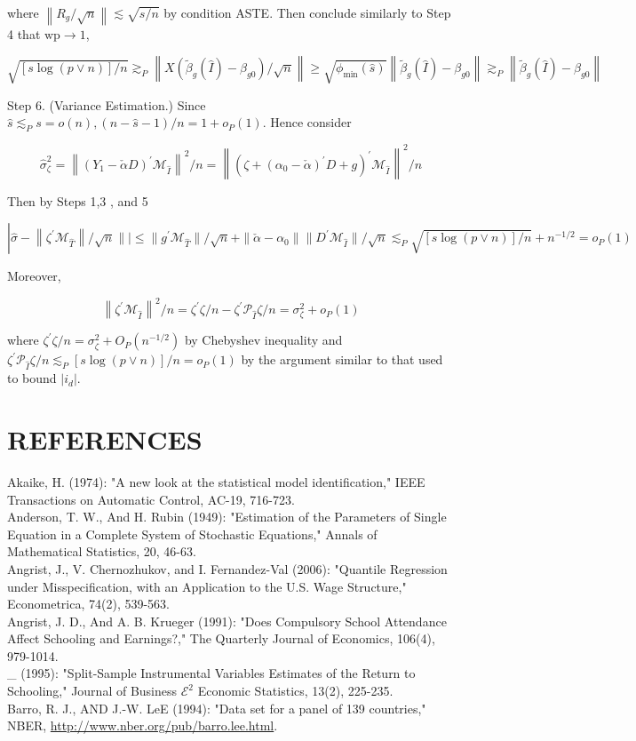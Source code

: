 \documentclass[10pt]{article}
\begin{document}
where \(\left\|R_{g} / \sqrt{n}\right\| \lesssim \sqrt{s / n}\) by condition ASTE. Then conclude similarly to Step 4 that \(\mathrm{wp} \rightarrow 1\),

\[
\sqrt{[s \log (p \vee n)] / n} \gtrsim_{P}\left\|X\left(\tilde{\beta}_{g}(\widehat{I})-\beta_{g 0}\right) / \sqrt{n}\right\| \geqslant \sqrt{\phi_{\min }(\widehat{s})}\left\|\tilde{\beta}_{g}(\widehat{I})-\beta_{g 0}\right\| \gtrsim_{P}\left\|\tilde{\beta}_{g}(\widehat{I})-\beta_{g 0}\right\|
\]

Step 6. (Variance Estimation.) Since \(\widehat{s} \lesssim_{P} s=o(n),(n-\widehat{s}-1) / n=1+o_{P}(1)\). Hence consider

\[
\widehat{\sigma}_{\zeta}^{2}=\left\|\left(Y_{1}-\check{\alpha} D\right)^{\prime} \mathcal{M}_{\widehat{I}}\right\|^{2} / n=\left\|\left(\zeta+\left(\alpha_{0}-\check{\alpha}\right)^{\prime} D+g\right)^{\prime} \mathcal{M}_{\widehat{I}}\right\|^{2} / n
\]

Then by Steps 1,3 , and 5

\[
\left|\hat{\sigma}-\left\|\zeta^{\prime} \mathcal{M}_{\hat{T}}\right\| / \sqrt{n}\|\mid \leqslant\| g^{\prime} \mathcal{M}_{\widehat{T}}\|/ \sqrt{n}+\| \check{\alpha}-\alpha_{0}\|\| D^{\prime} \mathcal{M}_{\hat{I}} \| / \sqrt{n} \lesssim_{P} \sqrt{[s \log (p \vee n)] / n}+n^{-1 / 2}=o_{P}(1)\right.
\]

Moreover,

\[
\left\|\zeta^{\prime} \mathcal{M}_{\widehat{I}}\right\|^{2} / n=\zeta^{\prime} \zeta / n-\zeta^{\prime} \mathcal{P}_{\widehat{I}} \zeta / n=\sigma_{\zeta}^{2}+o_{P}(1)
\]

where \(\zeta^{\prime} \zeta / n=\sigma_{\zeta}^{2}+O_{P}\left(n^{-1 / 2}\right)\) by Chebyshev inequality and \(\zeta^{\prime} \mathcal{P}_{\hat{I}} \zeta / n \lesssim_{P}[s \log (p \vee n)] / n=o_{P}(1)\) by the argument similar to that used to bound \(\left|i_{d}\right|\).

\section*{REFERENCES}
Akaike, H. (1974): "A new look at the statistical model identification," IEEE Transactions on Automatic Control, AC-19, 716-723.\\
Anderson, T. W., And H. Rubin (1949): "Estimation of the Parameters of Single Equation in a Complete System of Stochastic Equations," Annals of Mathematical Statistics, 20, 46-63.\\
Angrist, J., V. Chernozhukov, and I. Fernandez-Val (2006): "Quantile Regression under Misspecification, with an Application to the U.S. Wage Structure," Econometrica, 74(2), 539-563.\\
Angrist, J. D., And A. B. Krueger (1991): "Does Compulsory School Attendance Affect Schooling and Earnings?," The Quarterly Journal of Economics, 106(4), 979-1014.\\
\_ (1995): "Split-Sample Instrumental Variables Estimates of the Return to Schooling," Journal of Business \(\mathcal{E}^{2}\) Economic Statistics, 13(2), 225-235.\\
Barro, R. J., AND J.-W. LeE (1994): "Data set for a panel of 139 countries," NBER, \href{http://www.nber.org/pub/barro.lee.html}{http://www.nber.org/pub/barro.lee.html}.
\end{document}
